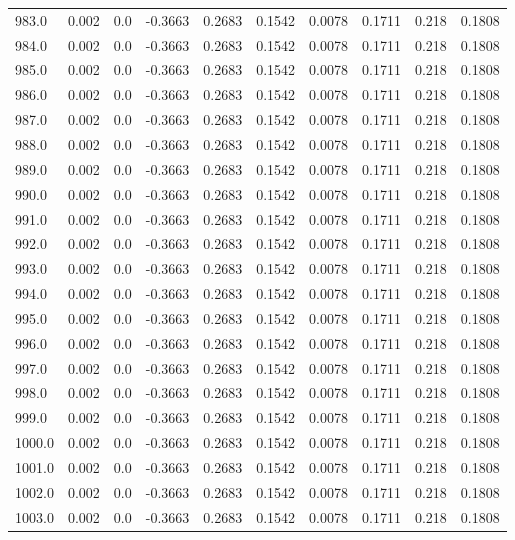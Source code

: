 \begin{longtable}{lrrrrrrrrr}
983.0 & 0.002 & 0.0 & -0.3663 & 0.2683 & 0.1542 & 0.0078 & 0.1711 & 0.218 & 0.1808 \\
984.0 & 0.002 & 0.0 & -0.3663 & 0.2683 & 0.1542 & 0.0078 & 0.1711 & 0.218 & 0.1808 \\
985.0 & 0.002 & 0.0 & -0.3663 & 0.2683 & 0.1542 & 0.0078 & 0.1711 & 0.218 & 0.1808 \\
986.0 & 0.002 & 0.0 & -0.3663 & 0.2683 & 0.1542 & 0.0078 & 0.1711 & 0.218 & 0.1808 \\
987.0 & 0.002 & 0.0 & -0.3663 & 0.2683 & 0.1542 & 0.0078 & 0.1711 & 0.218 & 0.1808 \\
988.0 & 0.002 & 0.0 & -0.3663 & 0.2683 & 0.1542 & 0.0078 & 0.1711 & 0.218 & 0.1808 \\
989.0 & 0.002 & 0.0 & -0.3663 & 0.2683 & 0.1542 & 0.0078 & 0.1711 & 0.218 & 0.1808 \\
990.0 & 0.002 & 0.0 & -0.3663 & 0.2683 & 0.1542 & 0.0078 & 0.1711 & 0.218 & 0.1808 \\
991.0 & 0.002 & 0.0 & -0.3663 & 0.2683 & 0.1542 & 0.0078 & 0.1711 & 0.218 & 0.1808 \\
992.0 & 0.002 & 0.0 & -0.3663 & 0.2683 & 0.1542 & 0.0078 & 0.1711 & 0.218 & 0.1808 \\
993.0 & 0.002 & 0.0 & -0.3663 & 0.2683 & 0.1542 & 0.0078 & 0.1711 & 0.218 & 0.1808 \\
994.0 & 0.002 & 0.0 & -0.3663 & 0.2683 & 0.1542 & 0.0078 & 0.1711 & 0.218 & 0.1808 \\
995.0 & 0.002 & 0.0 & -0.3663 & 0.2683 & 0.1542 & 0.0078 & 0.1711 & 0.218 & 0.1808 \\
996.0 & 0.002 & 0.0 & -0.3663 & 0.2683 & 0.1542 & 0.0078 & 0.1711 & 0.218 & 0.1808 \\
997.0 & 0.002 & 0.0 & -0.3663 & 0.2683 & 0.1542 & 0.0078 & 0.1711 & 0.218 & 0.1808 \\
998.0 & 0.002 & 0.0 & -0.3663 & 0.2683 & 0.1542 & 0.0078 & 0.1711 & 0.218 & 0.1808 \\
999.0 & 0.002 & 0.0 & -0.3663 & 0.2683 & 0.1542 & 0.0078 & 0.1711 & 0.218 & 0.1808 \\
1000.0 & 0.002 & 0.0 & -0.3663 & 0.2683 & 0.1542 & 0.0078 & 0.1711 & 0.218 & 0.1808 \\
1001.0 & 0.002 & 0.0 & -0.3663 & 0.2683 & 0.1542 & 0.0078 & 0.1711 & 0.218 & 0.1808 \\
1002.0 & 0.002 & 0.0 & -0.3663 & 0.2683 & 0.1542 & 0.0078 & 0.1711 & 0.218 & 0.1808 \\
1003.0 & 0.002 & 0.0 & -0.3663 & 0.2683 & 0.1542 & 0.0078 & 0.1711 & 0.218 & 0.1808 \\

\end{longtable}
